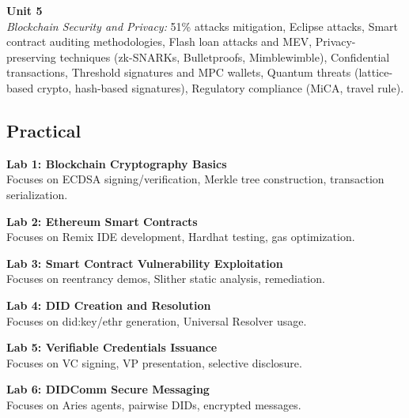 \vspace{0.3cm}

\noindent\textbf{Unit 5} \\
\textit{Blockchain Security and Privacy:} 51\% attacks mitigation, Eclipse attacks, Smart contract auditing methodologies, Flash loan attacks and MEV, Privacy-preserving techniques (zk-SNARKs, Bulletproofs, Mimblewimble), Confidential transactions, Threshold signatures and MPC wallets, Quantum threats (lattice-based crypto, hash-based signatures), Regulatory compliance (MiCA, travel rule).

\newpage

\subsection*{Practical}
\noindent\textbf{Lab 1: Blockchain Cryptography Basics} \\
Focuses on ECDSA signing/verification, Merkle tree construction, transaction serialization.

\vspace{0.2cm}

\noindent\textbf{Lab 2: Ethereum Smart Contracts} \\
Focuses on Remix IDE development, Hardhat testing, gas optimization.

\vspace{0.2cm}

\noindent\textbf{Lab 3: Smart Contract Vulnerability Exploitation} \\
Focuses on reentrancy demos, Slither static analysis, remediation.

\vspace{0.2cm}

\noindent\textbf{Lab 4: DID Creation and Resolution} \\
Focuses on did:key/ethr generation, Universal Resolver usage.

\vspace{0.2cm}

\noindent\textbf{Lab 5: Verifiable Credentials Issuance} \\
Focuses on VC signing, VP presentation, selective disclosure.

\vspace{0.2cm}

\noindent\textbf{Lab 6: DIDComm Secure Messaging} \\
Focuses on Aries agents, pairwise DIDs, encrypted messages.

\vspace{0.2cm}

